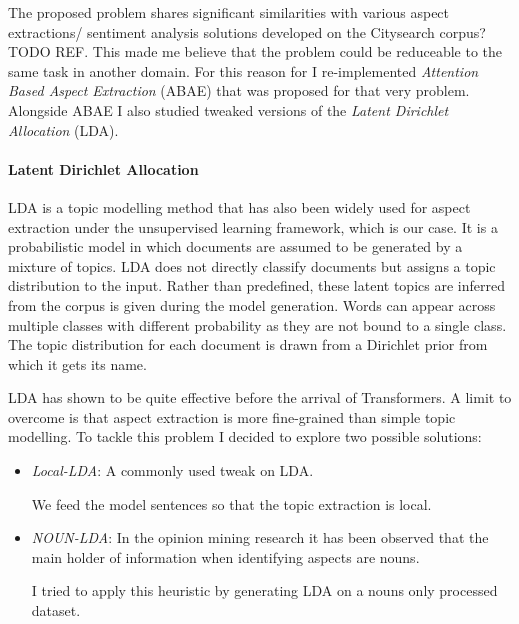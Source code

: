 The proposed problem shares significant similarities with various aspect extractions/ sentiment analysis solutions
developed on the Citysearch corpus?TODO REF. This made me believe that the problem could be reduceable to the same task
in another domain.
For this reason for I re-implemented \textit{Attention Based Aspect Extraction}  (ABAE)\cite{he-etal-2017-unsupervised}
that was proposed for that very problem.
Alongside ABAE I also studied tweaked versions of the \textit{Latent Dirichlet Allocation} (LDA).

\paragraph{Latent Dirichlet Allocation}
LDA is a topic modelling method that has also been widely used for aspect extraction under the unsupervised learning framework,
which is our case.
It is a probabilistic model in which documents are assumed to be generated by a mixture of topics.
LDA does not directly classify documents but assigns a topic distribution to the input.
Rather than predefined, these latent topics are inferred from the corpus is given during the model generation.
Words can appear across multiple classes with different probability as they are not bound to a single class.
The topic distribution for each document is drawn from a Dirichlet prior from which it gets its name.

LDA has shown to be quite effective before the arrival of Transformers. A limit to overcome is that aspect extraction
is more fine-grained than simple topic modelling.
To tackle this problem I decided to explore two possible solutions:
\begin{itemize}
    \item{\textit{Local-LDA}}: A commonly used tweak on LDA.

    We feed the model sentences so that the topic extraction is local.
    \item{\textit{NOUN-LDA}}: In the opinion mining research it has been observed that %
    the main holder of information when identifying aspects are nouns.

    I tried to apply this heuristic by generating LDA on a nouns only processed dataset.
\end{itemize}

